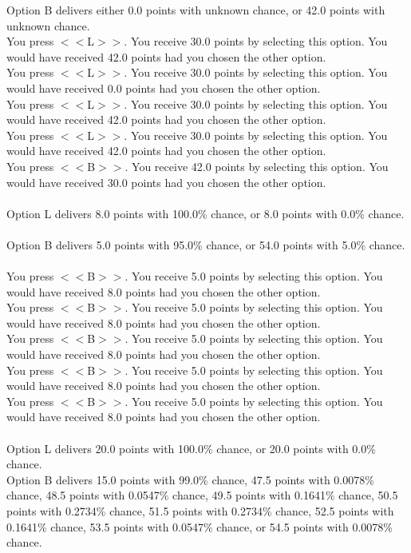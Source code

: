 \documentclass[pdflatex,sn-nature]{sn-jnl}%
\theoremstyle{thmstyleone}%
\theoremstyle{thmstyletwo}%
\theoremstyle{thmstylethree}%
\begin{document}
Option B delivers either 0.0 points with unknown chance, or 42.0 points with unknown chance. $~$\\ 
You press $<<$L$>>$. You receive 30.0 points by selecting this option. You would have received 42.0 points had you chosen the other option. $~$\\ 
You press $<<$L$>>$. You receive 30.0 points by selecting this option. You would have received 0.0 points had you chosen the other option. $~$\\ 
You press $<<$L$>>$. You receive 30.0 points by selecting this option. You would have received 42.0 points had you chosen the other option. $~$\\ 
You press $<<$L$>>$. You receive 30.0 points by selecting this option. You would have received 42.0 points had you chosen the other option. $~$\\ 
You press $<<$B$>>$. You receive 42.0 points by selecting this option. You would have received 30.0 points had you chosen the other option. $~$\\ 
 $~$\\ 
Option L delivers 8.0 points with 100.0\% chance, or 8.0 points with 0.0\% chance. $~$\\ 
Option B delivers 5.0 points with 95.0\% chance, or 54.0 points with 5.0\% chance. $~$\\ 
You press $<<$B$>>$. You receive 5.0 points by selecting this option. You would have received 8.0 points had you chosen the other option. $~$\\ 
You press $<<$B$>>$. You receive 5.0 points by selecting this option. You would have received 8.0 points had you chosen the other option. $~$\\ 
You press $<<$B$>>$. You receive 5.0 points by selecting this option. You would have received 8.0 points had you chosen the other option. $~$\\ 
You press $<<$B$>>$. You receive 5.0 points by selecting this option. You would have received 8.0 points had you chosen the other option. $~$\\ 
You press $<<$B$>>$. You receive 5.0 points by selecting this option. You would have received 8.0 points had you chosen the other option. $~$\\ 
 $~$\\ 
Option L delivers 20.0 points with 100.0\% chance, or 20.0 points with 0.0\% chance. $~$\\ 
Option B delivers 15.0 points with 99.0\% chance, 47.5 points with 0.0078\% chance, 48.5 points with 0.0547\% chance, 49.5 points with 0.1641\% chance, 50.5 points with 0.2734\% chance, 51.5 points with 0.2734\% chance, 52.5 points with 0.1641\% chance, 53.5 points with 0.0547\% chance, or 54.5 points with 0.0078\% chance. $~$\\ 
\end{document}
